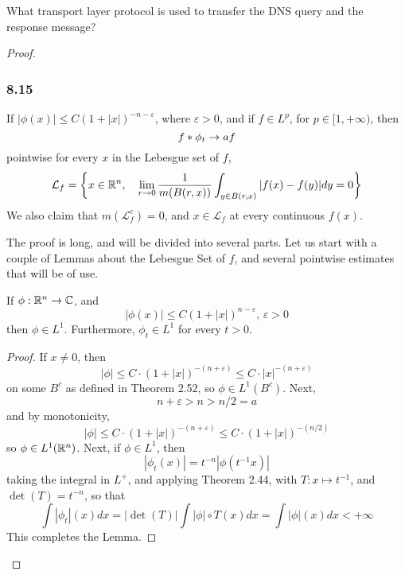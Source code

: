 \documentclass[../../main.tex]{subfiles}
\begin{document}
\begin{wts}
What transport layer protocol is used to transfer the DNS query and the response message? 
\end{wts}
\begin{proof}
\providecommand{\wl}{\mathcal{L}}
\subsubsection*{8.15}
\begin{wts}
    If $|\phi(x)|\leq C(1+|x|)^{-n-\varepsilon}$, where $\varepsilon>0$, and if $f\in L^p$, for $p\in[1,+\infty)$, then \[f\ast \phi_t\to af\]
    pointwise for every $x$ in the Lebesgue set of $f$, \[\mathcal{L}_f = \biggl\{{x\in\mathbb{R}^n,\quad\lim_{r\to 0}\dfrac{1}{m(B(r,x))}\int_{y\in B(r,x)}|f(x)-f(y)|dy = 0}\biggr\}\]
    We also claim that $m(\mathcal{L}_f^c)=0$, and $x\in \mathcal{L}_f$ at every continuous $f(x)$.
\end{wts}
The proof is long, and will be divided into several parts. Let us start with a couple of Lemmas about the Lebesgue Set of $f$, and several pointwise estimates that will be of use.
\begin{lemma}
    If $\phi:\mathbb{R}^n\to\mathbb{C}$, and\begin{equation}\label{phi estimate}
    |\phi(x)|\leq C(1+|x|)^{n-\varepsilon},\,\varepsilon>0\end{equation}
    then $\phi\in L^1$. Furthermore, $\phi_t\in L^1$ for every $t>0$.
\end{lemma}
\begin{proof}
    If $x\neq 0$, then
    \[
    |\phi|\leq C\cdot(1+|x|)^{-(n+\varepsilon)}\leq C\cdot|x|^{-(n+\varepsilon)}
    \]
    on some $B^c$ as defined in Theorem 2.52, so $\phi\in L^1(B^c)$. Next, \[n+\varepsilon>n>n/2=a\]
    and by monotonicity,\[|\phi|\leq C\cdot(1+|x|)^{-(n+\varepsilon)}\leq C\cdot (1+|x|)^{-(n/2)}\]
    so $\phi\in L^1(\mathbb{R}^n)$. Next, if $\phi\in L^1$, then\[|\phi_t(x)|=t^{-n}|\phi(t^{-1}x)|\]
    taking the integral in $L^+$, and applying Theorem 2.44, with $T:x\mapsto t^{-1}$, and $\det(T)=t^{-n}$, so that\[\int|\phi_t|(x)dx=|\det(T)|\int |\phi|\circ T(x)dx=\int |\phi|(x)dx<+\infty\]
    This completes the Lemma.
\end{proof}


\end{proof}
\end{document}
